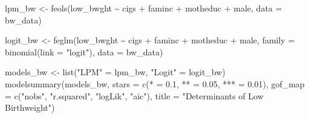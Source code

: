 \documentclass[
  letterpaper,
  DIV=11,
  numbers=noendperiod]{scrreprt}
\newenvironment{Shaded}{\begin{snugshade}}{\end{snugshade}}
\newcommand{\AttributeTok}[1]{\textcolor[rgb]{0.40,0.45,0.13}{#1}}
\newcommand{\FloatTok}[1]{\textcolor[rgb]{0.68,0.00,0.00}{#1}}
\newcommand{\FunctionTok}[1]{\textcolor[rgb]{0.28,0.35,0.67}{#1}}
\newcommand{\NormalTok}[1]{\textcolor[rgb]{0.00,0.23,0.31}{#1}}
\newcommand{\OtherTok}[1]{\textcolor[rgb]{0.00,0.23,0.31}{#1}}
\newcommand{\SpecialCharTok}[1]{\textcolor[rgb]{0.37,0.37,0.37}{#1}}
\newcommand{\StringTok}[1]{\textcolor[rgb]{0.13,0.47,0.30}{#1}}
\begin{document}
\begin{Shaded}
\begin{Highlighting}[]
\NormalTok{lpm\_bw }\OtherTok{\textless{}{-}} \FunctionTok{feols}\NormalTok{(low\_bwght }\SpecialCharTok{\textasciitilde{}}\NormalTok{ cigs }\SpecialCharTok{+}\NormalTok{ faminc }\SpecialCharTok{+}\NormalTok{ motheduc }\SpecialCharTok{+}\NormalTok{ male, }\AttributeTok{data =}\NormalTok{ bw\_data)}

\NormalTok{logit\_bw }\OtherTok{\textless{}{-}} \FunctionTok{feglm}\NormalTok{(low\_bwght }\SpecialCharTok{\textasciitilde{}}\NormalTok{ cigs }\SpecialCharTok{+}\NormalTok{ faminc }\SpecialCharTok{+}\NormalTok{ motheduc }\SpecialCharTok{+}\NormalTok{ male,}
                  \AttributeTok{family =} \FunctionTok{binomial}\NormalTok{(}\AttributeTok{link =} \StringTok{"logit"}\NormalTok{),}
                  \AttributeTok{data =}\NormalTok{ bw\_data)}

\NormalTok{models\_bw }\OtherTok{\textless{}{-}} \FunctionTok{list}\NormalTok{(}\StringTok{"LPM"} \OtherTok{=}\NormalTok{ lpm\_bw, }\StringTok{"Logit"} \OtherTok{=}\NormalTok{ logit\_bw)}
\FunctionTok{modelsummary}\NormalTok{(models\_bw,}
             \AttributeTok{stars =} \FunctionTok{c}\NormalTok{(}\StringTok{\textquotesingle{}*\textquotesingle{}} \OtherTok{=} \FloatTok{0.1}\NormalTok{, }\StringTok{\textquotesingle{}**\textquotesingle{}} \OtherTok{=} \FloatTok{0.05}\NormalTok{, }\StringTok{\textquotesingle{}***\textquotesingle{}} \OtherTok{=} \FloatTok{0.01}\NormalTok{),}
             \AttributeTok{gof\_map =} \FunctionTok{c}\NormalTok{(}\StringTok{"nobs"}\NormalTok{, }\StringTok{"r.squared"}\NormalTok{, }\StringTok{"logLik"}\NormalTok{, }\StringTok{"aic"}\NormalTok{),}
             \AttributeTok{title =} \StringTok{"Determinants of Low Birthweight"}\NormalTok{)}
\end{Highlighting}
\end{Shaded}
\end{document}
